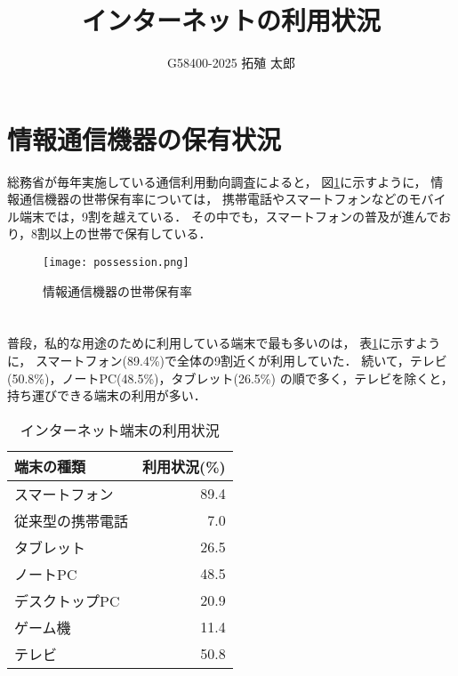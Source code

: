 \documentclass[a4paper,11pt,dvipdfmx]{ujarticle}
\title{インターネットの利用状況}
\author{G58400-2025 拓殖 太郎}
\begin{document}
\maketitle

\section{情報通信機器の保有状況}

総務省が毎年実施している通信利用動向調査\cite{soumu}によると，
図\ref{fig:保有率}に示すように，
情報通信機器の世帯保有率については，
携帯電話やスマートフォンなどのモバイル端末では，9割を越えている．
その中でも，スマートフォンの普及が進んでおり，8割以上の世帯で保有している．

\begin{figure}[htbp]
    \centering
    \texttt{[image: possession.png]}
    \caption{情報通信機器の世帯保有率}\label{fig:保有率}
\end{figure}

\section{}

普段，私的な用途のために利用している端末で最も多いのは，
表\ref{tbl:利用状況}に示すように，
スマートフォン(89.4\%)で全体の9割近くが利用していた．
続いて，テレビ(50.8\%)，ノートPC(48.5\%)，タブレット(26.5\%)
の順で多く，テレビを除くと，持ち運びできる端末の利用が多い\cite{corona}．

\begin{table}[htbp]
    \centering
    \caption{インターネット端末の利用状況}
    \label{tbl:利用状況}

    \begin{tabular}{|l|r|}\hline
        端末の種類 & 利用状況(\%) \\
        \hline
        スマートフォン & 89.4 \\
        \hline
        従来型の携帯電話 & 7.0 \\
        \hline
        タブレット & 26.5 \\
        \hline
        ノートPC & 48.5 \\
        \hline
        デスクトップPC & 20.9 \\
        \hline
        ゲーム機 & 11.4 \\
        \hline 
        テレビ & 50.8 \\
        \hline
    \end{tabular}
\end{table}
\end{document}
